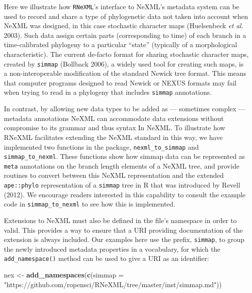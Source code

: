 \documentclass[author-year, review, 11pt]{components/elsarticle} %
\newenvironment{Shaded}{\begin{snugshade}}{\end{snugshade}}
\newcommand{\KeywordTok}[1]{\textcolor[rgb]{0.13,0.29,0.53}{\textbf{{#1}}}}
\newcommand{\DataTypeTok}[1]{\textcolor[rgb]{0.13,0.29,0.53}{{#1}}}
\newcommand{\StringTok}[1]{\textcolor[rgb]{0.31,0.60,0.02}{{#1}}}
\newcommand{\NormalTok}[1]{{#1}}
\begin{document}
Here we illustrate how \texttt{RNeXML}'s interface to NeXML's metadata
system can be used to record and share a type of phylogenetic data not
taken into account when NeXML was designed, in this case stochastic
character maps (Huelsenbeck \emph{et al.} 2003). Such data assign
certain parts (corresponding to time) of each branch in a
time-calibrated phylogeny to a particular ``state'' (typically of a
morphological characteristic). The current de-facto format for sharing
stochastic character maps, created by \texttt{simmap} (Bollback 2006), a
widely used tool for creating such maps, is a non-interoperable
modification of the standard Newick tree format. This means that
computer programs designed to read Newick or NEXUS formats may fail when
trying to read in a phylogeny that includes \texttt{simmap} annotations.

In contrast, by allowing new data types to be added as --- sometimes
complex --- metadata annotations NeXML can accommodate data extensions
without compromise to its grammar and thus syntax In NeXML. To
illustrate how RNeXML facilitates extending the NeXML standard in this
way, we have implemented two functions in the package,
\texttt{nexml\_to\_simmap} and \texttt{simmap\_to\_nexml}. These
functions show how simmap data can be represented as \texttt{meta}
annotations on the branch length elements of a NeXML tree, and provide
routines to convert between this NeXML representation and the extended
\texttt{ape::phylo} representation of a \texttt{simmap} tree in R that
was introduced by Revell (2012). We encourage readers interested in this
capability to consult the example code in \texttt{simmap\_to\_nexml} to
see how this is implemented.

Extensions to NeXML must also be defined in the file's namespace in
order to valid. This provides a way to ensure that a URI providing
documentation of the extension is always included. Our examples here use
the prefix, \texttt{simmap}, to group the newly introduced metadata
properties in a vocabulary, for which the \texttt{add\_namespace()}
method can be used to give a URI as an identifier:

\begin{Shaded}
\begin{Highlighting}[]
\NormalTok{nex <-}\StringTok{ }\KeywordTok{add_namespaces}\NormalTok{(}\KeywordTok{c}\NormalTok{(}\DataTypeTok{simmap =} 
  \StringTok{"https://github.com/ropensci/RNeXML/tree/master/inst/simmap.md"}\NormalTok{))}
\end{Highlighting}
\end{Shaded}
\end{document}

